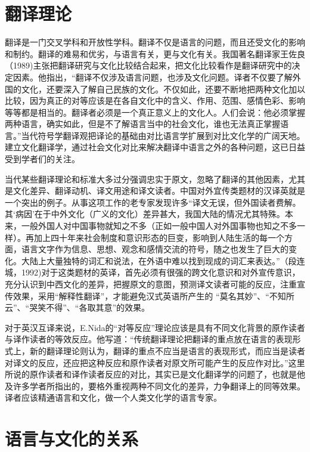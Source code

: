 \section{翻译理论}

翻译是一门交叉学科和开放性学科。翻译不仅是语言的问题，而且还受文化的影响和制约。翻译的难易和优劣，与语言有关，更与文化有关。我国著名翻译家王佐良（1989)主张把翻译研究与文化比较结合起来，把文化比较看作是翻译研究中的决定因素。他指出，“翻译不仅涉及语言问题，也涉及文化问题。译者不仅要了解外国的文化，还要深入了解自己民族的文化。不仅如此，还要不断地把两种文化加以比较，因为真正的对等应该是在各自文化中的含义、作用、范围、感情色彩、影响等等都是相当的。翻译者必须是一个真正意义上的文化人。人们会说：他必须掌握两种语言，确实如此，但是不了解语言当中的社会文化，谁也无法真正掌握语言。”当代符号学翻译观把译论的基础由对比语言学扩展到对比文化学的广阔天地。建立文化翻译学，通过社会文化对比来解决翻译中语言之外的各种问题，这已日益受到学者们的关注。

当代某些翻译理论和标准大多过分强调忠实于原文，忽略了翻译的其他因素，尤其是文化差异、翻译动机、译文用途和译文读者。中国对外宜传类题材的汉译英就是一个突出的例子。从事这项工作的老专家发现许多“译文无误，但外国读者费解。其‘病因’在于中外文化（广义的文化）差异甚大，我国大陆的情况尤其特殊。本来，一般外国人对中国事物就知之不多（正如一般中国人对外国事物也知之不多一样）。再加上四十年来社会制度和意识形态的巨变，影响到人陆生活的每一个方面，语言文字作为信息、思想、观念和感情交流的符号，随之也发生了巨大的变化。大陆上大量独特的词汇和说法，在外语中难以找到现成的词汇来表达。”（段连城，1992)对于这类题材的英译，首先必须有很强的跨文化意识和对外宣传意识，充分认识到中西文化的差异，把握原文的意图，预测译文读者可能的反应，注重宣传效果，采用“解释性翻译”，才能避免汉式英语所产生的
“莫名其妙”、“不知所云”、“哭笑不得”、“各取其意”的效果。

对于英汉互译来说，E.Nida的“对等反应”理论应该是具有不同文化背景的原作读者与译作读者的等效反应。他写道：“传统翻译理论把翻译的重点放在语言的表现形式上，新的翻译理论则认为，翻译的重点不应当是语言的表现形式，而应当是读者对译文的反应，还应把这种反应和原作读者对原文所可能产生的反应作对比。”这里所说的原作读者和译作读者反应的对比，其实已是文化翻译学的问题了，也就是他及许多学者所指出的，要格外重视两种不同文化的差异，力争翻译上的同等效果。译者应该精通语言和文化，做一个人类文化学的语言专家。

\section{语言与文化的关系}

